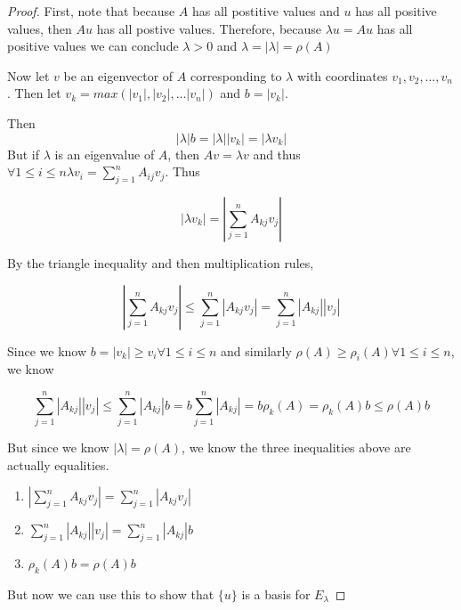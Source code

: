 \documentclass{amsart}
\theoremstyle{definition}
\theoremstyle{remark}
\numberwithin{equation}{section}
\begin{document}
\begin{proof}
First, note that because $A$ has all postitive values and $u$ has all positive values, then $Au$ has all postive values. Therefore, because $\lambda u = Au$ has all positive values we can conclude $\lambda > 0$ and $\lambda = |\lambda| = \rho(A)$


Now let $v$ be an eigenvector of $A$ corresponding to $\lambda$ with coordinates $v_1, v_2, \ldots, v_n$.  
Then let $v_k = max(|v_1|, |v_2|, \ldots |v_n|)$ and $b = |v_k|$.

Then $$ |\lambda| b = |\lambda| |v_k| = |\lambda v_k| $$
But if $\lambda$ is an eigenvalue of $A$, then $Av = \lambda v$ and thus $\forall 1 \leq i \leq n \lambda v_i = \sum_{j = 1}^n A_{ij}v_j$.
Thus

$$ |\lambda v_k| = | \sum_{j = 1}^n A_{kj}v_j | $$

By the triangle inequality and then multiplication rules,

$$ | \sum_{j = 1}^n A_{kj}v_j | \leq \sum_{j=1}^n |A_{kj}v_j| = \sum_{j=1}^n |A_{kj}| |v_j| $$

Since we know $b = |v_k| \geq v_i \forall 1 \leq i \leq n$ and similarly $\rho(A) \geq  \rho_i(A) \forall 1 \leq i \leq n $, we know 

$$ \sum_{j=1}^n |A_{kj}| |v_j|  \leq \sum_{j=1}^n |A_{kj}| b = b \sum_{j=1}^n |A_{kj}| =  b\rho_k(A) = \rho_k(A)b \leq \rho(A)b $$


But since we know $|\lambda| = \rho(A)$, we know the three inequalities above are actually equalities.

\begin{enumerate}

	\item $| \sum_{j = 1}^n A_{kj}v_j | = \sum_{j=1}^n |A_{kj}v_j|$

	\item $\sum_{j=1}^n |A_{kj}| |v_j|  = \sum_{j=1}^n |A_{kj}| b$

	\item $\rho_k(A)b = \rho(A)b$

\end{enumerate}


But now we can use this to show that $\{ u \}$ is a basis for $E_{\lambda}$



\end{proof}
\end{document}
